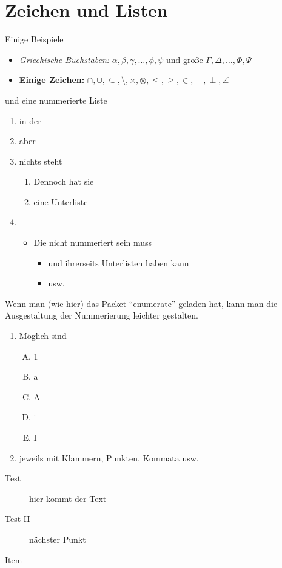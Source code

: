 \section{Zeichen und Listen}

Einige Beispiele

\begin{itemize}
\item \textit{Griechische Buchstaben:} $\alpha, \beta, \gamma, \dots, \phi,
\psi$ und große $\Gamma, \Delta, \dots, \Phi, \Psi$

\item \textbf{Einige Zeichen:} $\cap, \cup, \subseteq, \setminus,
  \times, \otimes, \le, \ge, \in, \parallel, \perp, \angle$
\end{itemize}
und eine nummerierte Liste
\begin{enumerate}
\item in der 
\item aber
\item nichts steht
  \begin{enumerate}
  \item Dennoch hat sie 
  \item eine Unterliste
  \end{enumerate}
\item 
  \begin{itemize}
  \item Die nicht nummeriert sein muss
    \begin{itemize}
    \item und ihrerseits Unterlisten haben kann
    \item usw.
    \end{itemize}
  \end{itemize}
\end{enumerate}

Wenn man (wie hier) das Packet ``enumerate'' geladen hat, kann man die
Ausgestaltung der Nummerierung leichter gestalten.

\begin{enumerate}[\bfseries (E1)]
\item M\"oglich sind
  \begin{enumerate}[A.)]
  \item 1
  \item a
  \item A
  \item i
  \item I
  \end{enumerate}
  \item jeweils mit Klammern, Punkten, Kommata usw.
\end{enumerate}

\begin{description}
\item [Test] hier kommt der Text
\item[Test II] nächster Punkt
\item[Item] 
\end{description}